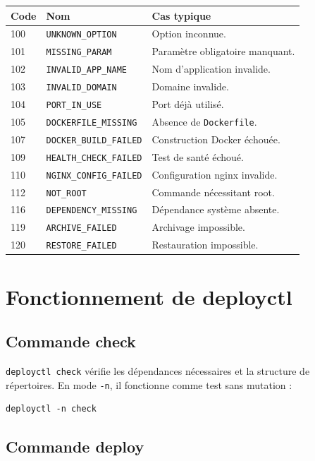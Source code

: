 \documentclass[12pt,a4paper]{article}
\begin{document}
\begin{longtable}{p{}p{}p{}}
\toprule
\textbf{Code} & \textbf{Nom} & \textbf{Cas typique} \\
\midrule
100 & \texttt{UNKNOWN\_OPTION} & Option inconnue. \\
101 & \texttt{MISSING\_PARAM} & Paramètre obligatoire manquant. \\
102 & \texttt{INVALID\_APP\_NAME} & Nom d'application invalide. \\
103 & \texttt{INVALID\_DOMAIN} & Domaine invalide. \\
104 & \texttt{PORT\_IN\_USE} & Port déjà utilisé. \\
105 & \texttt{DOCKERFILE\_MISSING} & Absence de \texttt{Dockerfile}. \\
107 & \texttt{DOCKER\_BUILD\_FAILED} & Construction Docker échouée. \\
109 & \texttt{HEALTH\_CHECK\_FAILED} & Test de santé échoué. \\
110 & \texttt{NGINX\_CONFIG\_FAILED} & Configuration nginx invalide. \\
112 & \texttt{NOT\_ROOT} & Commande nécessitant root. \\
116 & \texttt{DEPENDENCY\_MISSING} & Dépendance système absente. \\
119 & \texttt{ARCHIVE\_FAILED} & Archivage impossible. \\
120 & \texttt{RESTORE\_FAILED} & Restauration impossible. \\
\bottomrule
\end{longtable}

\section{Fonctionnement de deployctl}

\subsection{Commande check}

\texttt{deployctl check} vérifie les dépendances nécessaires et la structure de répertoires. En mode \texttt{-n}, il fonctionne comme test sans mutation :

\begin{lstlisting}
deployctl -n check
\end{lstlisting}

\subsection{Commande deploy}
\end{document}
